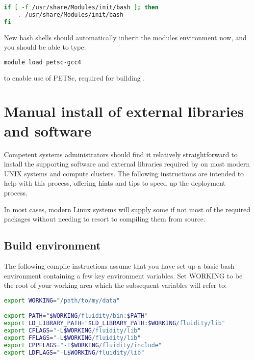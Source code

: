 \begin{lstlisting}[language=bash]
if [ -f /usr/share/Modules/init/bash ]; then
    . /usr/share/Modules/init/bash
fi
\end{lstlisting}

New bash shells should automatically inherit the modules environment now, and
you should be able to type:

\begin{lstlisting}[language=bash]
module load petsc-gcc4
\end{lstlisting}

to enable use of PETSc, required for building \fluidity.
 
\section{Manual install of external libraries and software}
\label{sec:required_ḻibraries_manual_install}

Competent systems administrators should find it relatively straightforward to
install the supporting software and external libraries required by \fluidity on
most modern UNIX systems and compute clusters. The following instructions are
intended to help with this process, offering hints and tips to speed up the
deployment process.

In most cases, modern Linux systems will supply some if not most of the
required packages without needing to resort to compiling them from source.

\subsection{Build environment}
\label{sec:required_libraries_build_environment}

The following compile instructions assume that you have set up a basic bash
environment containing a few key environment variables. Set WORKING to be the
root of your working area which the subsequent variables will refer to:

\begin{lstlisting}[language=bash]
export WORKING="/path/to/my/data"

export PATH="$WORKING/fluidity/bin:$PATH"
export LD_LIBRARY_PATH="$LD_LIBRARY_PATH:$WORKING/fluidity/lib"
export CFLAGS="-L$WORKING/fluidity/lib"
export FFLAGS="-L$WORKING/fluidity/lib"
export CPPFLAGS="-I$WORKING/fluidity/include"
export LDFLAGS="-L$WORKING/fluidity/lib"
\end{lstlisting}

